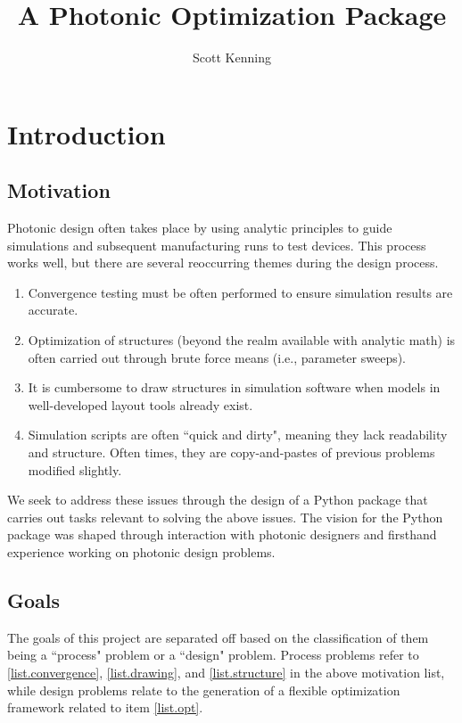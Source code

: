 \documentclass[12pt]{article}
\author{Scott Kenning}
\title{A Photonic Optimization Package}
\begin{document}
\maketitle

\section{Introduction}

\subsection{Motivation}
Photonic design often takes place by using analytic principles to guide simulations and subsequent manufacturing runs to test devices. This process works well, but there are several reoccurring themes during the design process.
\begin{enumerate}
\item Convergence testing must be often performed to ensure simulation results are accurate.\label{list.convergence}
\item Optimization of structures (beyond the realm available with analytic math) is often carried out through brute force means (i.e., parameter sweeps).\label{list.opt}
\item It is cumbersome to draw structures in simulation software when models in well-developed layout tools already exist.\label{list.drawing}
\item Simulation scripts are often ``quick and dirty", meaning they lack readability and structure. Often times, they are copy-and-pastes of previous problems modified slightly.\label{list.structure}
\end{enumerate}
We seek to address these issues through the design of a Python package that carries out tasks relevant to solving the above issues. The vision for the Python package was shaped through interaction with photonic designers and firsthand experience working on photonic design problems. 

\subsection{Goals}
The goals of this project are separated off based on the classification of them being a ``process" problem or a ``design" problem. Process problems refer to \ref{list.convergence}, \ref{list.drawing}, and \ref{list.structure} in the above motivation list, while design problems relate to the generation of a flexible optimization framework related to item \ref{list.opt}.
\end{document}
